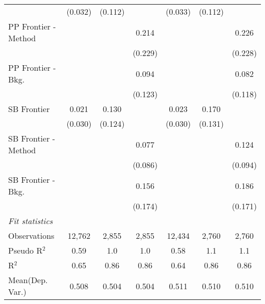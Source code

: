 \begin{tabular}{lcccccc}
                        & (0.032)        & (0.112) &         & (0.033)        & (0.112) &   \\   
   PP Frontier - Method &                &         & 0.214   &                &         & 0.226\\   
                        &                &         & (0.229) &                &         & (0.228)\\   
   PP Frontier - Bkg.   &                &         & 0.094   &                &         & 0.082\\   
                        &                &         & (0.123) &                &         & (0.118)\\   
   SB Frontier          & 0.021          & 0.130   &         & 0.023          & 0.170   &   \\   
                        & (0.030)        & (0.124) &         & (0.030)        & (0.131) &   \\   
   SB Frontier - Method &                &         & 0.077   &                &         & 0.124\\   
                        &                &         & (0.086) &                &         & (0.094)\\   
   SB Frontier - Bkg.   &                &         & 0.156   &                &         & 0.186\\   
                        &                &         & (0.174) &                &         & (0.171)\\   
   \midrule
   \emph{Fit statistics}\\
   Observations         & 12,762         & 2,855   & 2,855   & 12,434         & 2,760   & 2,760\\  
   Pseudo R$^2$         & 0.59           & 1.0     & 1.0     & 0.58           & 1.1     & 1.1\\  
   R$^2$                & 0.65           & 0.86    & 0.86    & 0.64           & 0.86    & 0.86\\  
Mean(Dep. Var.) & 0.508 & 0.504 & 0.504 & 0.511 & 0.510 & 0.510 \\
   

\end{tabular}
